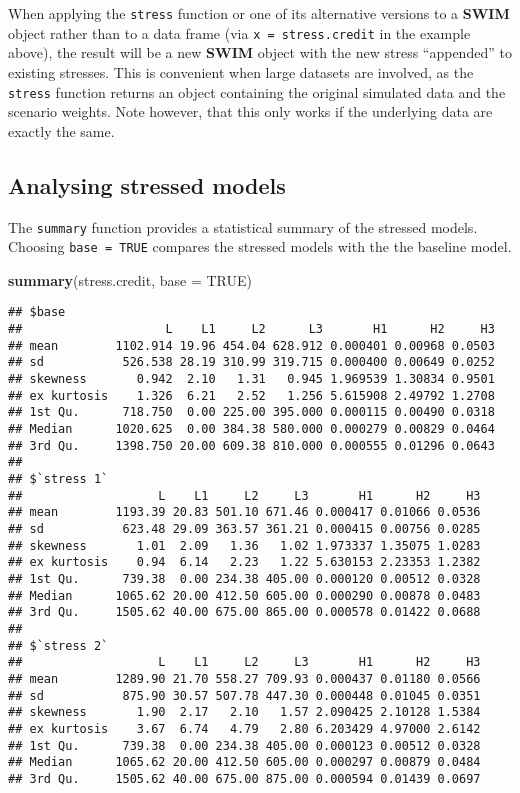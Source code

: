 \documentclass[
]{article}
\newenvironment{Shaded}{\begin{snugshade}}{\end{snugshade}}
\newcommand{\DataTypeTok}[1]{\textcolor[rgb]{0.13,0.29,0.53}{#1}}
\newcommand{\KeywordTok}[1]{\textcolor[rgb]{0.13,0.29,0.53}{\textbf{#1}}}
\newcommand{\NormalTok}[1]{#1}
\newcommand{\OtherTok}[1]{\textcolor[rgb]{0.56,0.35,0.01}{#1}}
\begin{document}
When applying the \texttt{stress} function or one of its alternative versions to a \textbf{SWIM} object rather than to a data frame (via \texttt{x\ =\ stress.credit} in the example above), the result will be a new \textbf{SWIM} object with the new stress ``appended'' to existing stresses. This is convenient when large datasets are involved, as the \texttt{stress} function returns an object containing the original simulated data and the scenario weights. Note however, that this only works if the underlying data are exactly the same.

\hypertarget{analysing-stressed-models}{%
\subsection{Analysing stressed models}\label{analysing-stressed-models}}

The \texttt{summary} function provides a statistical summary of the stressed models. Choosing \texttt{base\ =\ TRUE} compares the stressed models with the the baseline model.

\begin{Shaded}
\begin{Highlighting}[]
\KeywordTok{summary}\NormalTok{(stress.credit, }\DataTypeTok{base =} \OtherTok{TRUE}\NormalTok{)}
\end{Highlighting}
\end{Shaded}

\begin{verbatim}
## $base
##                    L    L1     L2      L3       H1      H2     H3
## mean        1102.914 19.96 454.04 628.912 0.000401 0.00968 0.0503
## sd           526.538 28.19 310.99 319.715 0.000400 0.00649 0.0252
## skewness       0.942  2.10   1.31   0.945 1.969539 1.30834 0.9501
## ex kurtosis    1.326  6.21   2.52   1.256 5.615908 2.49792 1.2708
## 1st Qu.      718.750  0.00 225.00 395.000 0.000115 0.00490 0.0318
## Median      1020.625  0.00 384.38 580.000 0.000279 0.00829 0.0464
## 3rd Qu.     1398.750 20.00 609.38 810.000 0.000555 0.01296 0.0643
## 
## $`stress 1`
##                   L    L1     L2     L3       H1      H2     H3
## mean        1193.39 20.83 501.10 671.46 0.000417 0.01066 0.0536
## sd           623.48 29.09 363.57 361.21 0.000415 0.00756 0.0285
## skewness       1.01  2.09   1.36   1.02 1.973337 1.35075 1.0283
## ex kurtosis    0.94  6.14   2.23   1.22 5.630153 2.23353 1.2382
## 1st Qu.      739.38  0.00 234.38 405.00 0.000120 0.00512 0.0328
## Median      1065.62 20.00 412.50 605.00 0.000290 0.00878 0.0483
## 3rd Qu.     1505.62 40.00 675.00 865.00 0.000578 0.01422 0.0688
## 
## $`stress 2`
##                   L    L1     L2     L3       H1      H2     H3
## mean        1289.90 21.70 558.27 709.93 0.000437 0.01180 0.0566
## sd           875.90 30.57 507.78 447.30 0.000448 0.01045 0.0351
## skewness       1.90  2.17   2.10   1.57 2.090425 2.10128 1.5384
## ex kurtosis    3.67  6.74   4.79   2.80 6.203429 4.97000 2.6142
## 1st Qu.      739.38  0.00 234.38 405.00 0.000123 0.00512 0.0328
## Median      1065.62 20.00 412.50 605.00 0.000297 0.00879 0.0484
## 3rd Qu.     1505.62 40.00 675.00 875.00 0.000594 0.01439 0.0697
\end{verbatim}
\end{document}
